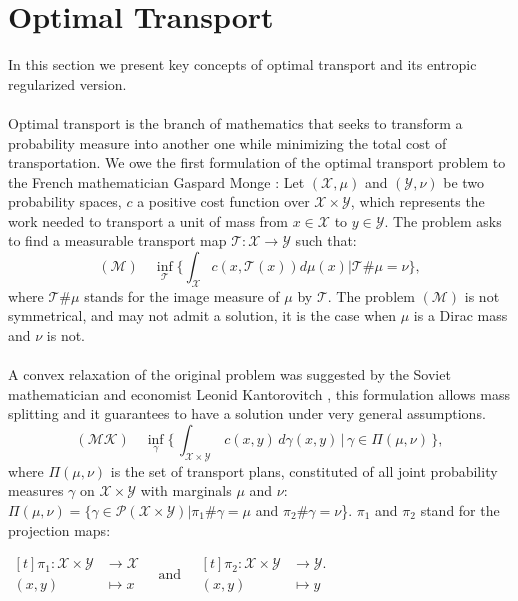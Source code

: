\documentclass[conference]{IEEEtran}
\begin{document}
\section{Optimal Transport}
In this section we present key concepts of optimal transport and its entropic regularized version. 
\\
\\ Optimal transport \cite{villani2008optimal}\cite{santambrogio2015optimal} is the branch of mathematics that seeks to transform a probability measure into another one while minimizing the total cost of transportation. We owe the first formulation of the optimal transport problem to the French mathematician Gaspard Monge \cite{monge1781memoire}: Let $(\mathcal{X},\mu)$ and $(\mathcal{Y},\nu)$ be two probability spaces, $c$ a positive cost function over $\mathcal{X}\times\mathcal{Y}$, which represents the work needed to transport a unit of mass from $x \in \mathcal{X}$ to $y \in \mathcal{Y}$. The problem asks to find a measurable transport map  $\mathcal{T} : \mathcal{X} \to \mathcal{Y}$ such that:
\begin{equation} (\mathcal{M}) \,\,\,\,\,\,\underset{\mathcal{T}}{\inf}\{\int_{\mathcal{X}}  c(x,\mathcal{T}(x)) d\mu(x) |  \mathcal{T}\#\mu = \nu \},   \end{equation}
where $\mathcal{T}\#\mu$ stands for the image measure of $\mu$ by $\mathcal{T}$. 
The problem $(\mathcal{M})$ is not symmetrical, and may not admit a solution, it is the case when $\mu$ is a Dirac mass and $\nu$ is not.
\\
\\ A convex relaxation of the original problem was suggested by the Soviet mathematician and economist Leonid Kantorovitch \cite{kantorovich1942translocation}, this formulation allows mass splitting and it guarantees to have a solution under very general assumptions.
\begin{equation} (\mathcal{MK}) \,\,\,\,\,\,\underset{\gamma}{\inf} \{\, \int_{\mathcal{X}\times\mathcal{Y}} \, c(x,y) \, d\gamma(x,y) \,|\, \gamma \in \Pi(\mu,\nu)\, \}, \end{equation}
where $\Pi(\mu,\nu)$ is the set of transport plans, constituted of all joint probability measures $\gamma$ on $\mathcal{X}\times\mathcal{Y}$ with marginals $\mu$ and $\nu$: $\Pi(\mu,\nu) = \{ \gamma \in \mathcal{P}(\mathcal{X}\times\mathcal{Y})|\pi_1\#\gamma = \mu$ and $\pi_2\#\gamma = \nu$\}.     
${\pi}_{1}$ and ${\pi}_{2}$ stand for the projection maps:
\begin{center}
$\begin{aligned}[t]
\pi_1 \colon \mathcal{X}\times\mathcal{Y} &\to \mathcal{X} \\
(x,y) &\mapsto x 
\end{aligned}
\quad\text{and}\quad
\begin{aligned}[t]
\pi_2 \colon \mathcal{X}\times\mathcal{Y} &\to \mathcal{Y}. \\
(x,y) &\mapsto y
\end{aligned}$
\end{center}
\end{document}
